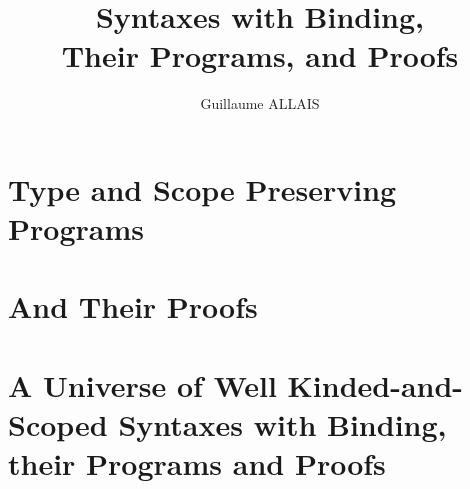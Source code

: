 \documentclass{memoir}
\title{\Huge Syntaxes with Binding, \\ Their Programs, and Proofs}
\author{\Large Guillaume ALLAIS}
\begin{document}
\frontmatter

\cleardoublepage{}

\maketitle{}

\mainmatter
\pagestyle{ruled}
\begin{KeepFromToc}
\tableofcontents
\end{KeepFromToc}

\label{introduction}


\label{introduction-agda}


\part{Type and Scope Preserving Programs}
\label{type-scope-semantics}






\part{And Their Proofs}
\label{properties}





\part{A Universe of Well Kinded-and-Scoped Syntaxes with Binding, their Programs and Proofs}
\label{a-universe}









\cleardoublepage{}
\listoffigures


\end{document}
